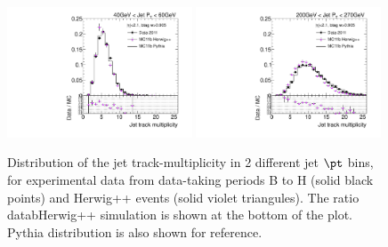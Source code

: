 \begin{figure}[tp]
\centering
\includegraphics[width=0.49\textwidth]{FIGS/systematics/DataVarNtrkPT040.pdf}
\includegraphics[width=0.49\textwidth]{FIGS/systematics/DataVarNtrkPT200.pdf}
\caption{Distribution of the jet track-multiplicity in 2 different jet $\pt$ bins, for experimental data from data-taking periods B to H (solid black points) and Herwig++ events (solid violet triangules). The ratio datab\/Herwig++ simulation is shown at the bottom of the plot. Pythia distribution is also shown for reference.}
\label{fig:herwigdatamc}
\end{figure}

